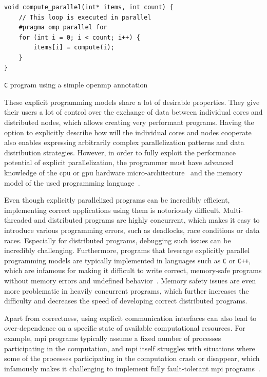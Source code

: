 \begin{description}[wide=0pt]
		\begin{listing}
			\begin{verbatim}
void compute_parallel(int* items, int count) {
	// This loop is executed in parallel
	#pragma omp parallel for
	for (int i = 0; i < count; i++) {
		items[i] = compute(i);
	}
}
        	\end{verbatim}
			\caption{\texttt{C} program using a simple \gls{openmp} annotation}
			\label{lst:openmp-annotation}
		\end{listing}
\end{description}

These explicit programming models share a lot of desirable properties. They give their users a lot
of control over the exchange of data between individual cores and distributed nodes, which allows
creating very performant programs. Having the option to explicitly describe how will the individual
cores and nodes cooperate also enables expressing arbitrarily complex parallelization patterns and
data distribution strategies. However, in order to fully exploit the performance potential of
explicit parallelization, the programmer must have advanced knowledge of the \gls{cpu}
or \gls{gpu} hardware micro-architecture~\cite{intel_developer_manual} and the memory model
of the used programming language~\cite{cpp11_standard}.

Even though explicitly parallelized programs can be incredibly efficient, implementing correct
applications using them is notoriously difficult. Multi-threaded and distributed programs are highly
concurrent, which makes it easy to introduce various programming errors, such as deadlocks, race
conditions or data races. Especially for distributed programs, debugging such issues can be
incredibly challenging. Furthermore, programs that leverage explicitly parallel programming models
are typically implemented in languages such as \texttt{C} or \texttt{C++},
which are infamous for making it difficult to write correct, memory-safe programs without memory
errors and undefined behavior~\cite{memory_safety_report}. Memory safety issues are even more
problematic in heavily concurrent programs, which further increases the difficulty and decreases
the speed of developing correct distributed programs.

Apart from correctness, using explicit communication interfaces can also lead to over-dependence on
a specific state of available computational resources. For example, \gls{mpi} programs
typically assume a fixed number of processes participating in the computation, and
\gls{mpi} itself struggles with situations where some of the processes participating
in the computation crash or disappear, which infamously makes it challenging to implement fully
fault-tolerant \gls{mpi} programs~\cite{fault_tolerant_mpi}.

